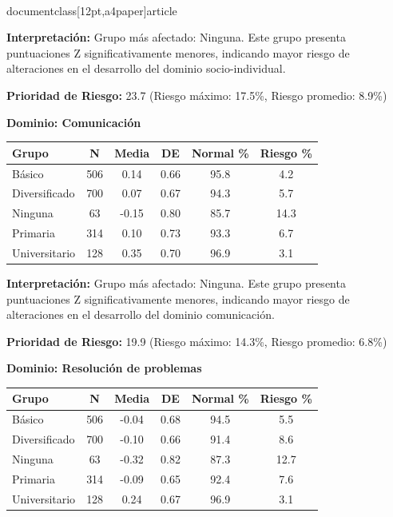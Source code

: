 \\documentclass[12pt,a4paper]{article}
\begin{document}
\textbf{Interpretación:} Grupo más afectado: Ninguna. Este grupo presenta puntuaciones Z significativamente menores, indicando mayor riesgo de alteraciones en el desarrollo del dominio socio-individual.

\textbf{Prioridad de Riesgo:} 23.7 (Riesgo máximo: 17.5\%, Riesgo promedio: 8.9\%)


\vspace{0.5cm}


\textbf{Dominio: Comunicación}


\begin{center}
\begin{tabular}{|l|c|c|c|c|c|}
\hline
\textbf{Grupo} & \textbf{N} & \textbf{Media} & \textbf{DE} & \textbf{Normal \%} & \textbf{Riesgo \%} \\
\hline
Básico & 506 & 0.14 & 0.66 & 95.8 & 4.2 \\
Diversificado & 700 & 0.07 & 0.67 & 94.3 & 5.7 \\
Ninguna & 63 & -0.15 & 0.80 & 85.7 & 14.3 \\
Primaria & 314 & 0.10 & 0.73 & 93.3 & 6.7 \\
Universitario & 128 & 0.35 & 0.70 & 96.9 & 3.1 \\

\hline
\end{tabular}
\end{center}


\textbf{Interpretación:} Grupo más afectado: Ninguna. Este grupo presenta puntuaciones Z significativamente menores, indicando mayor riesgo de alteraciones en el desarrollo del dominio comunicación.

\textbf{Prioridad de Riesgo:} 19.9 (Riesgo máximo: 14.3\%, Riesgo promedio: 6.8\%)


\vspace{0.5cm}


\textbf{Dominio: Resolución de problemas}


\begin{center}
\begin{tabular}{|l|c|c|c|c|c|}
\hline
\textbf{Grupo} & \textbf{N} & \textbf{Media} & \textbf{DE} & \textbf{Normal \%} & \textbf{Riesgo \%} \\
\hline
Básico & 506 & -0.04 & 0.68 & 94.5 & 5.5 \\
Diversificado & 700 & -0.10 & 0.66 & 91.4 & 8.6 \\
Ninguna & 63 & -0.32 & 0.82 & 87.3 & 12.7 \\
Primaria & 314 & -0.09 & 0.65 & 92.4 & 7.6 \\
Universitario & 128 & 0.24 & 0.67 & 96.9 & 3.1 \\

\hline
\end{tabular}
\end{center}
\end{document}

